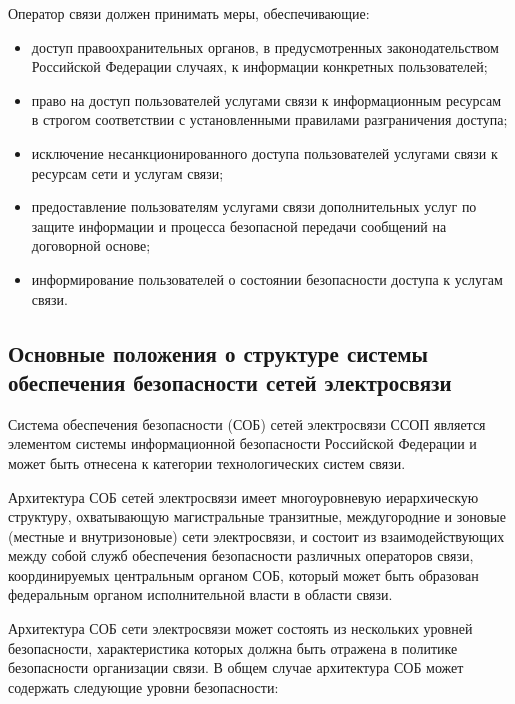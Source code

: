 \documentclass[12pt, russian, oneside, article]{ncc}
\begin{document}
Оператор связи должен принимать меры, обеспечивающие:
\begin{itemize}
\item доступ правоохранительных органов, в предусмотренных законодательством Российской Федерации случаях, к информации конкретных пользователей;
\item право на доступ пользователей услугами связи к информационным ресурсам в строгом соответствии с установленными правилами разграничения доступа;
\item исключение несанкционированного доступа пользователей услугами связи к ресурсам сети и услугам связи;
\item предоставление пользователям услугами связи дополнительных услуг по защите информации и процесса безопасной передачи сообщений на договорной основе;
\item информирование пользователей о состоянии безопасности доступа к услугам связи.
\end{itemize}
\subsection{Основные положения о структуре системы обеспечения безопасности сетей электросвязи}
\label{sec-1_7}


Система обеспечения безопасности (СОБ) сетей электросвязи ССОП является элементом системы информационной безопасности Российской Федерации и может быть отнесена к категории технологических систем связи.

Архитектура СОБ сетей электросвязи имеет многоуровневую иерархическую структуру, охватывающую магистральные транзитные, междугородние и зоновые (местные и внутризоновые) сети электросвязи, и состоит из взаимодействующих между собой служб обеспечения безопасности различных операторов связи, координируемых центральным органом СОБ, который может быть образован федеральным органом исполнительной власти в области связи.

Архитектура СОБ сети электросвязи может состоять из нескольких уровней безопасности, характеристика которых должна быть отражена в политике безопасности организации связи. В общем случае архитектура СОБ может содержать следующие уровни безопасности:
\end{document}
